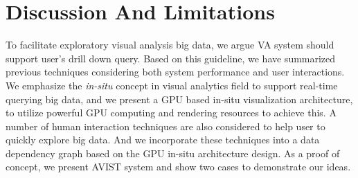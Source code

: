 \documentclass[journal]{vgtc}                %
\begin{document}
{%

\section{Discussion And Limitations}

To facilitate exploratory visual analysis big data, we argue VA system should support user's drill down query. Based on this guideline, we have summarized previous techniques considering both system performance and user interactions. 
We emphasize the \emph{in-situ} concept in visual analytics field to support real-time querying big data, and we present a GPU based in-situ visualization architecture, to utilize powerful GPU computing and rendering resources to achieve this. A number of human interaction techniques are also considered to help user to quickly explore big data. And we incorporate these techniques into a data dependency graph based on the GPU in-situ architecture design. As a proof of concept, we present AVIST system and show two cases to demonstrate our ideas.

}
\end{document}
